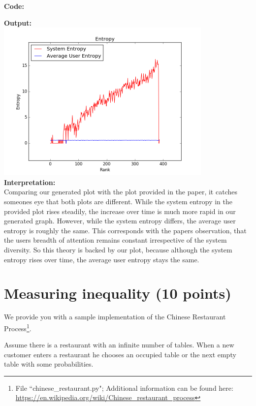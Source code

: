 \documentclass{WeSTassignment}
\begin{document}
\textbf{Code:}

\textbf{Output:}\\
\includegraphics[width=400px]{figure_1}\\
\textbf{Interpretation:}\\
Comparing our generated plot with the plot provided in the paper, it catches someones eye that both plots are different. While the system entropy in the provided plot rises steadily, the increase over time is much more rapid in our generated graph. However, while the system entropy differs, the average user entropy is roughly the same. This corresponds with the papers observation, that the users breadth of attention remains constant irrespective of the system diversity. So this theory is backed by our plot, because although the system entropy rises over time, the average user entropy stays the same. 




\section{Measuring inequality (10 points)}

We provide you with a sample implementation of the Chinese Restaurant Process\footnote{File ``chinese\_restaurant.py"; Additional information can be found here: \url{https://en.wikipedia.org/wiki/Chinese_restaurant_process}}.

Assume there is a restaurant with an infinite number of tables. 
When a new customer enters a restaurant he chooses an occupied table or the next empty table with some probabilities.
\end{document}
